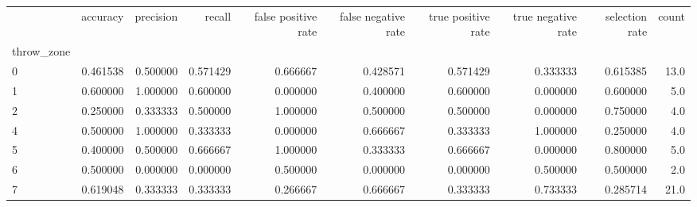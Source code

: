 \begin{tabular}{lrrrrrrrrr}
\toprule
{} &  accuracy &  precision &    recall &  false positive rate &  false negative rate &  true positive rate &  true negative rate &  selection rate &  count \\
throw\_zone &           &            &           &                      &                      &                     &                     &                 &        \\
\midrule
0          &  0.461538 &   0.500000 &  0.571429 &             0.666667 &             0.428571 &            0.571429 &            0.333333 &        0.615385 &   13.0 \\
1          &  0.600000 &   1.000000 &  0.600000 &             0.000000 &             0.400000 &            0.600000 &            0.000000 &        0.600000 &    5.0 \\
2          &  0.250000 &   0.333333 &  0.500000 &             1.000000 &             0.500000 &            0.500000 &            0.000000 &        0.750000 &    4.0 \\
4          &  0.500000 &   1.000000 &  0.333333 &             0.000000 &             0.666667 &            0.333333 &            1.000000 &        0.250000 &    4.0 \\
5          &  0.400000 &   0.500000 &  0.666667 &             1.000000 &             0.333333 &            0.666667 &            0.000000 &        0.800000 &    5.0 \\
6          &  0.500000 &   0.000000 &  0.000000 &             0.500000 &             0.000000 &            0.000000 &            0.500000 &        0.500000 &    2.0 \\
7          &  0.619048 &   0.333333 &  0.333333 &             0.266667 &             0.666667 &            0.333333 &            0.733333 &        0.285714 &   21.0 \\
\bottomrule
\end{tabular}
